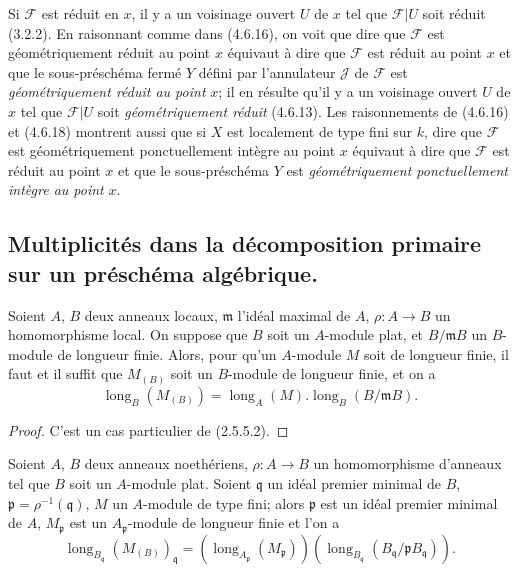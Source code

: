 
Si $\mathscr F$ est réduit en $x$, il y a un voisinage ouvert $U$ de $x$ tel
que $\mathscr F|U$ soit réduit (3.2.2). En raisonnant comme dans (4.6.16), on
voit que dire que $\mathscr F$ est géométriquement réduit au point $x$
équivaut à dire que $\mathscr F$ est réduit au point $x$ et que le
sous-préschéma fermé $Y$ défini par l'annulateur $\mathscr J$ de $\mathscr F$
est \emph{géométriquement réduit au point} $x$; il en résulte qu'il y a un voisinage
ouvert $U$ de $x$ tel que $\mathscr F|U$ soit \emph{géométriquement réduit} (4.6.13).
Les raisonnements de (4.6.16) et (4.6.18) montrent aussi que si $X$ est
localement de type fini sur $k$, dire que $\mathscr F$ est géométriquement
ponctuellement intègre au point $x$ équivaut à dire que $\mathscr F$ est
réduit au point $x$ et que le sous-préschéma $Y$ est \emph{géométriquement
ponctuellement intègre au point} $x$.

\subsection{Multiplicités dans la décomposition primaire sur un préschéma
algébrique.}
\label{subsection:IV.4.7-fr}

\begin{lemma}[4.7.1]
\label{IV.2.4.7.1-fr}
Soient $A$, $B$ deux anneaux locaux, $\mathfrak m$ l'idéal maximal de $A$,
$\rho:A\to B$ un homomorphisme local. On suppose que $B$ soit un $A$-module
plat, et $B/\mathfrak mB$ un $B$-module de longueur finie. Alors, pour qu'un
$A$-module $M$ soit de longueur finie, il faut et il suffit que $M_{(B)}$ soit
un $B$-module de longueur finie, et on a
\begin{equation}
\operatorname{long}_B(M_{(B)})
=\operatorname{long}_A(M).\operatorname{long}_B(B/\mathfrak mB).
\tag{4.7.1.1}
\label{IV.2.4.7.1.1-fr}
\end{equation}
\end{lemma}

\begin{proof}
C'est un cas particulier de (2.5.5.2).
\end{proof}


\begin{corollary}[4.7.2]
\label{IV.2.4.7.2-fr}
Soient $A$, $B$ deux anneaux noethériens, $\rho:A\to B$ un homomorphisme
d'anneaux tel que $B$ soit un $A$-module plat. Soient $\mathfrak q$ un idéal
premier minimal de $B$, $\mathfrak p=\rho^{-1}(\mathfrak q)$, $M$ un
$A$-module de type fini; alors $\mathfrak p$ est un idéal premier minimal de
$A$, $M_{\mathfrak p}$ est un $A_{\mathfrak p}$-module de longueur finie et
l'on a
\begin{equation}
\operatorname{long}_{B_{\mathfrak q}}(M_{(B)})_{\mathfrak q}
=(\operatorname{long}_{A_{\mathfrak p}}(M_{\mathfrak p}))
 (\operatorname{long}_{B_{\mathfrak q}}
 (B_{\mathfrak q}/\mathfrak pB_{\mathfrak q})).
\tag{4.7.2.1}
\label{IV.2.4.7.2.1-fr}
\end{equation}
\end{corollary}

